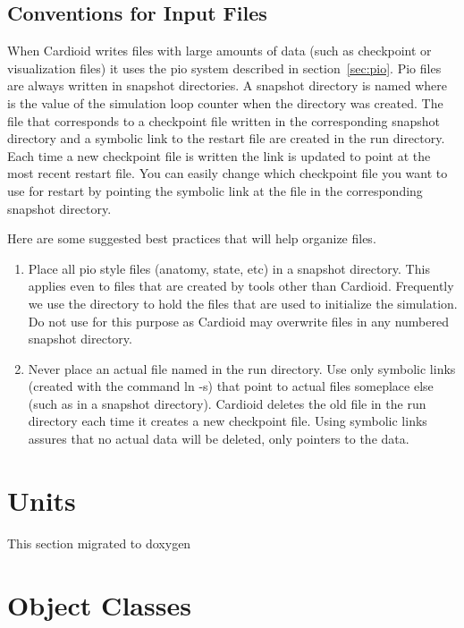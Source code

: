 \documentclass{article}
\begin{document}
\subsection{Conventions for Input Files}

When Cardioid writes files with large amounts of data (such as
checkpoint or visualization files) it uses the pio system described in
section~\ref{sec:pio}.  Pio files are always written in snapshot
directories.  A snapshot directory is named 
where  is the value of the simulation loop counter when
the directory was created.  The  file that corresponds to
a checkpoint file written in the corresponding snapshot directory and a
symbolic link to the restart file are created in the run directory.  Each
time a new checkpoint file is written the link is updated to point at
the most recent restart file.  You can easily change which checkpoint
file you want to use for restart by pointing the symbolic link at the 
 file in the corresponding snapshot directory.

Here are some suggested best practices that will help organize files.
\begin{enumerate}
\item  Place all pio style files (anatomy, state, etc) in a snapshot
  directory.  This applies even to files that are created by tools other
  than Cardioid.  Frequently we use the directory
   to hold the files that are used to initialize
  the simulation.  Do not use  for this purpose
  as Cardioid may overwrite files in any numbered snapshot directory.
\item Never place an actual file named  in the run
  directory.  Use only symbolic links (created with the command ln -s)
  that point to actual files someplace else (such as in a snapshot
  directory).  Cardioid deletes the old  file in the run
  directory each time it creates a new checkpoint file.  Using symbolic
  links assures that no actual data will be deleted, only pointers to
  the data.
\end{enumerate}


\section{Units}

This section migrated to doxygen

\section{Object Classes}
\end{document}
